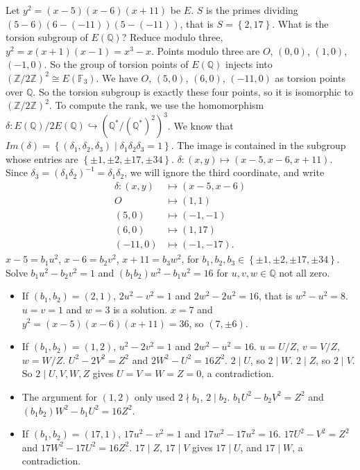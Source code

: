 \documentclass{article}
\newcommand{\F}{\mathbb{F}}
\newcommand{\Z}{\mathbb{Z}}
\newcommand{\Q}{\mathbb{Q}}
\newcommand{\rb}[1]{\left( #1 \right)}
\newcommand{\cb}[1]{\left\{ #1 \right\}}
\theoremstyle{definition}\newtheorem{definition}{Definition}[section]
\theoremstyle{definition}\newtheorem{remark}[definition]{Remark}
\theoremstyle{definition}\newtheorem*{example}{Example}
\theoremstyle{definition}\newtheorem*{note}{Note}
\begin{document}
Let $ y^2 = \rb{x - 5}\rb{x - 6}\rb{x + 11} $ be $ E $. $ S $ is the primes dividing $ \rb{5 - 6}\rb{6 - \rb{-11}}\rb{5 - \rb{-11}} $, that is $ S = \cb{2, 17} $. What is the torsion subgroup of $ E\rb{\Q} $? Reduce modulo three, $ y^2 = x\rb{x + 1}\rb{x - 1} = x^3 - x $. Points modulo three are $ O $, $ \rb{0, 0} $, $ \rb{1, 0} $, $ \rb{-1, 0} $. So the group of torsion points of $ E\rb{\Q} $ injects into $ \rb{\Z / 2\Z}^2 \cong E\rb{\F_3} $. We have $ O $, $ \rb{5, 0} $, $ \rb{6, 0} $, $ \rb{-11, 0} $ as torsion points over $ \Q $. So the torsion subgroup is exactly these four points, so it is isomorphic to $ \rb{\Z / 2\Z}^2 $. To compute the rank, we use the homomorphism $ \delta : E\rb{\Q} / 2E\rb{\Q} \hookrightarrow \rb{\Q^* / \rb{\Q^*}^2}^3 $. We know that $ Im\rb{\delta} = \cb{\rb{\delta_1, \delta_2, \delta_3} \mid \delta_1\delta_2\delta_3 = 1} $. The image is contained in the subgroup whose entries are $ \cb{\pm 1, \pm 2, \pm 17, \pm 34} $. $ \delta : \rb{x, y} \mapsto \rb{x - 5, x - 6, x + 11} $. Since $ \delta_3 = \rb{\delta_1\delta_2}^{-1} = \delta_1\delta_2 $, we will ignore the third coordinate, and write
\begin{align*}
\delta : \rb{x, y} & \mapsto \rb{x - 5, x - 6} \\
O & \mapsto \rb{1, 1} \\
\rb{5, 0} & \mapsto \rb{-1, -1} \\
\rb{6, 0} & \mapsto \rb{1, 17} \\
\rb{-11, 0} & \mapsto \rb{-1, -17}.
\end{align*}
$ x - 5 = b_1u^2 $, $ x - 6 = b_2v^2 $, $ x + 11 = b_3w^2 $, for $ b_1, b_2, b_3 \in \cb{\pm 1, \pm 2, \pm 17, \pm 34} $. Solve $ b_1u^2 - b_2v^2 = 1 $ and $ \rb{b_1b_2}w^2 - b_1u^2 = 16 $ for $ u, v, w \in \Q $ not all zero.
\begin{itemize}
\item If $ \rb{b_1, b_2} = \rb{2, 1} $, $ 2u^2 - v^2 = 1 $ and $ 2w^2 - 2u^2 = 16 $, that is $ w^2 - u^2 = 8 $. $ u = v = 1 $ and $ w = 3 $ is a solution. $ x = 7 $ and $ y^2 = \rb{x - 5}\rb{x - 6}\rb{x + 11} = 36 $, so $ \rb{7, \pm 6} $.
\item If $ \rb{b_1, b_2} = \rb{1, 2} $, $ u^2 - 2v^2 = 1 $ and $ 2w^2 - u^2 = 16 $. $ u = U / Z $, $ v = V / Z $, $ w = W / Z $. $ U^2 - 2V^2 = Z^2 $ and $ 2W^2 - U^2 = 16Z^2 $. $ 2 \mid U $, so $ 2 \mid W $. $ 2 \mid Z $, so $ 2 \mid V $. So $ 2 \mid U, V, W, Z $ gives $ U = V = W = Z = 0 $, a contradiction.
\item The argument for $ \rb{1, 2} $ only used $ 2 \nmid b_1 $, $ 2 \mid b_2 $. $ b_1U^2 - b_2V^2 = Z^2 $ and $ \rb{b_1b_2}W^2 - b_1U^2 = 16Z^2 $.
\item If $ \rb{b_1, b_2} = \rb{17, 1} $, $ 17u^2 - v^2 = 1 $ and $ 17w^2 - 17u^2 = 16 $. $ 17U^2 - V^2 = Z^2 $ and $ 17W^2 - 17U^2 = 16Z^2 $. $ 17 \mid Z $, $ 17 \mid V $ gives $ 17 \mid U $, and $ 17 \mid W $, a contradiction.
\end{itemize}
\end{document}
